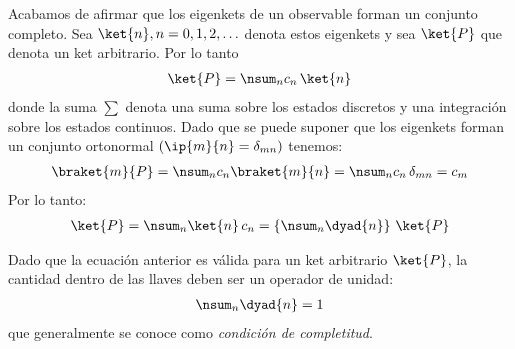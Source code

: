 Acabamos de afirmar que los eigenkets de un observable forman un conjunto completo. Sea $\ket{n}, n = 0, 1, 2, \ldots$ denota estos eigenkets y sea $\ket{P}$ que denota un ket arbitrario. Por lo tanto
\begin{align*}
\ket{P} = \nsum_{n} c_{n} \, \ket{n}
\end{align*}
donde la suma $\sum$ denota una suma sobre los estados discretos y una integración sobre los estados continuos. Dado que se puede suponer que los eigenkets forman un conjunto ortonormal $(\ip{m}{n} = \delta_{mn})$ tenemos:
\begin{align*}
\braket{m}{P} = \nsum_{n} c_{n} \braket{m}{n} = \nsum_{n} c_{n} \, \delta_{mn} = c_{m}
\end{align*}
Por lo tanto:
\begin{align}
\ket{P} = \nsum_{n} \ket{n} \, c_{n} = \left\{ \nsum_{n} \dyad{n} \right\} \, \ket{P}
\label{eq:ecuacion_39}
\end{align}

Dado que la ecuación anterior es válida para un ket arbitrario $\ket{P}$, la cantidad dentro de las llaves deben ser un operador de unidad:
\begin{align}
\nsum_{n} \dyad{n} = 1
\label{eq:ecuacion_40}
\end{align}
que generalmente se conoce como \emph{condición de completitud}.

